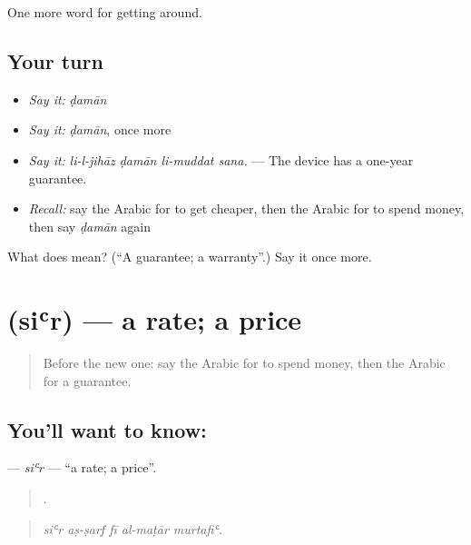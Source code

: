 \begin{grammarlens}[title={What you've built}]
One more word for getting around.
\end{grammarlens}

\subsection*{Your turn}
\begin{itemize}
\raggedright
  \item \emph{Say it:} \emph{ḍamān}
  \item \emph{Say it:} \emph{ḍamān}, once more
  \item \emph{Say it:} \emph{li-l-jihāz ḍamān li-muddat sana.} — The device has a one-year guarantee.
  \item \emph{Recall:} say the Arabic for to get cheaper, then the Arabic for to spend money, then say \emph{ḍamān} again
\end{itemize}

\begin{tcolorbox}[breakable,colback=teal!4,colframe=teal!35!black,title={Before you move on}]
What does  mean? (\textquotedblleft{}A guarantee; a warranty\textquotedblright{}.) Say it once more.
\end{tcolorbox}
\section[\texorpdfstring{\ar{سعر} (siʿr)}{سعر (siʿr)}]{ (siʿr) — a rate; a price}

\label{lesson:AR-C458-sir}



\begin{quote}
Before the new one: say the Arabic for to spend money, then the Arabic for a guarantee.
\end{quote}

\subsection*{You'll want to know: }
\textbf{} — \emph{siʿr} — \textquotedblleft{}a rate; a price\textquotedblright{}.

\begin{quote}
    .
\end{quote}

\begin{quote}
\emph{siʿr aṣ-ṣarf fī al-maṭār murtafiʿ.}
\end{quote}

